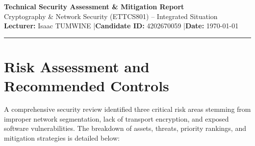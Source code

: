 \documentclass[12pt,a4paper]{article}
\begin{document}
\thispagestyle{plain}

\begin{center}
    \vspace*{0.2cm}
    {\Large\bfseries Technical Security Assessment \& Mitigation Report}\\[0.3em]
    {\normalsize Cryptography \& Network Security (ETTCS801) -- Integrated Situation}\\[0.5em]
    \textbf{Lecturer:} Isaac TUMWINE \quad|\quad \textbf{Candidate ID:} 4202670059 \quad|\quad \textbf{Date:} \today
\end{center}
\vspace{0.1cm}
\hrule
\vspace{0.8em}

\section{Risk Assessment and Recommended Controls}

A comprehensive security review identified three critical risk areas stemming from improper network segmentation, lack of transport encryption, and exposed software vulnerabilities. The breakdown of assets, threats, priority rankings, and mitigation strategies is detailed below:
\end{document}
